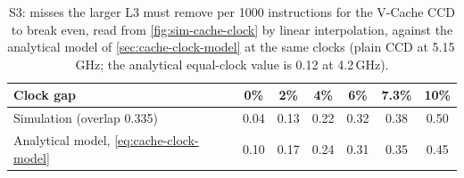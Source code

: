 \begin{table}[htbp]
  \centering
  \caption[S3: break-even misses removed for each clock gap]{S3: misses the larger L3 must remove per 1000 instructions for the V-Cache CCD to break even, read from \cref{fig:sim-cache-clock} by linear interpolation, against the analytical model of \cref{sec:cache-clock-model} at the same clocks (plain CCD at 5.15\,GHz; the analytical equal-clock value is 0.12 at 4.2\,GHz).}
  \label{tab:sim-breakeven}
  \small
  \begin{tabular}{@{}lcccccc@{}}
    \toprule
    \textbf{Clock gap} & 0\% & 2\% & 4\% & 6\% & 7.3\% & 10\% \\
    \midrule
    Simulation (overlap 0.335) & 0.04 & 0.13 & 0.22 & 0.32 & 0.38 & 0.50 \\
    Analytical model, \cref{eq:cache-clock-model} & 0.10 & 0.17 & 0.24 & 0.31 & 0.35 & 0.45 \\
    \bottomrule
  \end{tabular}
\end{table}
